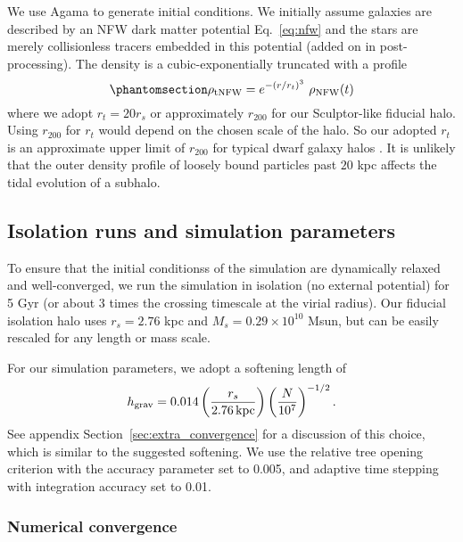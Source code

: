 We use Agama \citep{agama} to generate initial conditions. We initially
assume galaxies are described by an NFW dark matter potential
Eq.~\ref{eq:nfw} and the stars are merely collisionless tracers embedded
in this potential (added on in post-processing). The density is a
cubic-exponentially truncated with a profile
\begin{equation}\protect\phantomsection\label{eq:trunc_nfw}{
\rho_{\rm tNFW} = e^{-(r/r_t)^3}\ \rho_{\rm NFW}(t)
}\end{equation} where we adopt \(r_t = 20 r_s\) or approximately
\(r_{200}\) for our Sculptor-like fiducial halo. Using \(r_{200}\) for
\(r_t\) would depend on the chosen scale of the halo. So our adopted
\(r_t\) is an approximate upper limit of \(r_{200}\) for typical dwarf
galaxy halos \citep{ludlow+2016}. It is unlikely that the outer density
profile of loosely bound particles past \(20\) kpc affects the tidal
evolution of a subhalo.

\subsection{Isolation runs and simulation
parameters}\label{isolation-runs-and-simulation-parameters}

To ensure that the initial conditionss of the simulation are dynamically
relaxed and well-converged, we run the simulation in isolation (no
external potential) for 5 Gyr (or about 3 times the crossing timescale
at the virial radius). Our fiducial isolation halo uses \(r_s=2.76\) kpc
and \(M_s = 0.29 \times 10^{10}\) Msun, but can be easily rescaled for
any length or mass scale.

For our simulation parameters, we adopt a softening length of
\begin{equation}{
h_{\rm grav} = 0.014 \left(\frac{r_s}{2.76\,{\rm kpc}}\right)\left(\frac{N}{10^7}\right)^{-1/2}.
}\end{equation} See appendix Section~\ref{sec:extra_convergence} for a
discussion of this choice, which is similar to the \citet{power+2003}
suggested softening. We use the relative tree opening criterion with the
accuracy parameter set to 0.005, and adaptive time stepping with
integration accuracy set to 0.01.

\subsubsection{Numerical convergence}\label{numerical-convergence}

